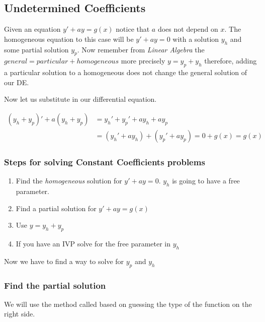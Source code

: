 \subsection{Undetermined Coefficients}

Given an equation \(y' + ay = g(x)\) notice that \(a\) does not depend on \(x\).
The homogeneous equation to this case will be \(y' + ay = 0\) with a solution \(y_h\) and some
partial solution \(y_p\). Now remember from \emph{Linear Algebra} the 
\(general = particular + homogeneous\) more precisely \(y = y_p + y_h\) therefore, adding a 
particular solution to a homogeneous does not change
the general solution of our DE.
\vspace{\baselineskip}

Now let us substitute in our differential equation.

\begin{align*}
    (y_h + y_p)' + a(y_h + y_p) &= y_h' + y_p' + ay_h + ay_p\\   
    &= (y_h' + ay_h) + (y_p' + ay_p) = 0 + g(x) = g(x) 
\end{align*}

\subsubsection{Steps for solving Constant Coefficients problems}

\begin{enumerate}

    \item Find the \emph{homogeneous} solution for \(y' + ay = 0\). \(y_h\) is going
          to have a free parameter.
    
    \item Find a partial solution for \(y' + ay = g(x)\)
    
    \item Use \(y = y_h + y_p\)
    
    \item If you have an IVP solve for the free parameter in \(y_h\)

\end{enumerate}

Now we have to find a way to solve for \(y_p\) and \(y_h\)

\subsubsection{Find the partial solution}

We will use the method called based on guessing the type of the function on the right side.
\vspace{\baselineskip}

